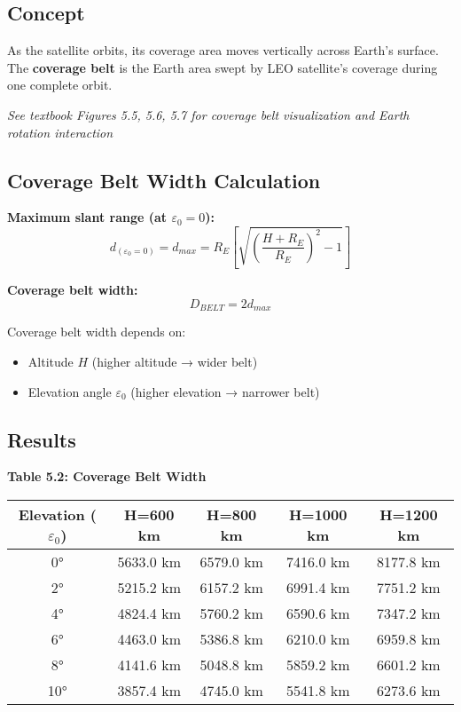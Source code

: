 \documentclass[11pt,letterpaper]{article}
\begin{document}
\subsection{Concept}
As the satellite orbits, its coverage area moves vertically across Earth's surface. The \textbf{coverage belt} is the Earth area swept by LEO satellite's coverage during one complete orbit.

\textit{See textbook Figures 5.5, 5.6, 5.7 for coverage belt visualization and Earth rotation interaction}

\subsection{Coverage Belt Width Calculation}

\textbf{Maximum slant range (at $\varepsilon_0 = 0$):}
\begin{equation}
d_{(\varepsilon_0=0)} = d_{max} = R_E \left[\sqrt{\left(\frac{H + R_E}{R_E}\right)^2 - 1}\right]
\end{equation}

\textbf{Coverage belt width:}
\begin{equation}
D_{BELT} = 2d_{max}
\end{equation}

Coverage belt width depends on:
\begin{itemize}
    \item Altitude $H$ (higher altitude → wider belt)
    \item Elevation angle $\varepsilon_0$ (higher elevation → narrower belt)
\end{itemize}

\subsection{Results}

\textbf{Table 5.2: Coverage Belt Width}

\begin{center}
\begin{tabular}{|c|c|c|c|c|}
\hline
\textbf{Elevation ($\varepsilon_0$)} & \textbf{H=600 km} & \textbf{H=800 km} & \textbf{H=1000 km} & \textbf{H=1200 km} \\
\hline
0° & 5633.0 km & 6579.0 km & 7416.0 km & 8177.8 km \\
2° & 5215.2 km & 6157.2 km & 6991.4 km & 7751.2 km \\
4° & 4824.4 km & 5760.2 km & 6590.6 km & 7347.2 km \\
6° & 4463.0 km & 5386.8 km & 6210.0 km & 6959.8 km \\
8° & 4141.6 km & 5048.8 km & 5859.2 km & 6601.2 km \\
10° & 3857.4 km & 4745.0 km & 5541.8 km & 6273.6 km \\
\hline
\end{tabular}
\end{center}
\end{document}
